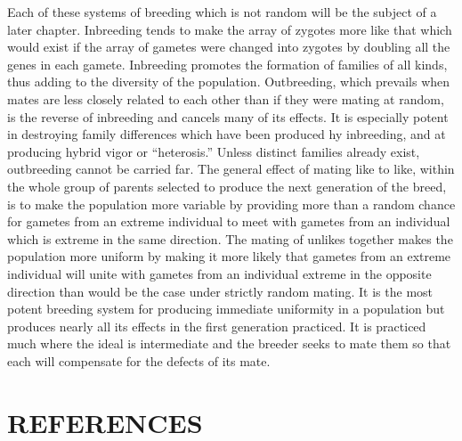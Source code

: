 Each of these systems of breeding which is not random will be the
subject of a later chapter. Inbreeding tends to make the array of zygotes
more like that which would exist if the array of gametes were changed
into zygotes by doubling all the genes in each gamete. Inbreeding promotes
the formation of families of all kinds, thus adding to the diversity
of the population. Outbreeding, which prevails when mates are less
closely related to each other than if they were mating at random, is the
reverse of inbreeding and cancels many of its effects. It is especially
potent in destroying family differences which have been produced hy
inbreeding, and at producing hybrid vigor or ``heterosis.'' Unless distinct
families already exist, outbreeding cannot be carried far. The
general effect of mating like to like, within the whole group of parents
selected to produce the next generation of the breed, is to make the
population more variable by providing more than a random chance for
gametes from an extreme individual to meet with gametes from an individual
which is extreme in the same direction. The mating of unlikes
together makes the population more uniform by making it more likely
that gametes from an extreme individual will unite with gametes from
an individual extreme in the opposite direction than would be the
case under strictly random mating. It is the most potent breeding system
for producing immediate uniformity in a population but produces
nearly all its effects in the first generation practiced. It is practiced
much where the ideal is intermediate and the breeder seeks to mate
them so that each will compensate for the defects of its mate.

\section*{REFERENCES}

